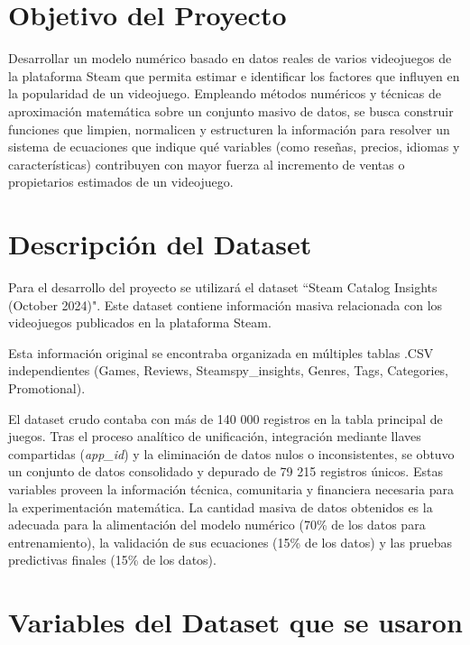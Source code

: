 \documentclass[12pt]{report}
\begin{document}
\section*{Objetivo del Proyecto}

Desarrollar un modelo numérico basado en datos reales de varios videojuegos de la plataforma Steam que permita estimar e identificar los factores que influyen en la popularidad de un videojuego. Empleando métodos numéricos y técnicas de aproximación matemática sobre un conjunto masivo de datos, se busca construir funciones que limpien, normalicen y estructuren la información para resolver un sistema de ecuaciones que indique qué variables (como reseñas, precios, idiomas y características) contribuyen con mayor fuerza al incremento de ventas o propietarios estimados de un videojuego.


\section*{Descripción del Dataset}

Para el desarrollo del proyecto se utilizará el dataset “Steam Catalog Insights (October 2024)"\cite{newbie_steam_insights}. Este dataset contiene información masiva relacionada con los videojuegos publicados en la plataforma Steam.

Esta información original se encontraba organizada en múltiples tablas .CSV independientes (Games, Reviews, Steamspy\_insights, Genres, Tags, Categories, Promotional). 

El dataset crudo contaba con más de 140 000 registros en la tabla principal de juegos. Tras el proceso analítico de unificación, integración mediante llaves compartidas (\textit{app\_id}) y la eliminación de datos nulos o inconsistentes, se obtuvo un conjunto de datos consolidado y depurado de 79 215 registros únicos. Estas variables proveen la información técnica, comunitaria y financiera necesaria para la experimentación matemática. La cantidad masiva de datos obtenidos es la adecuada para la alimentación del modelo numérico (70\% de los datos para entrenamiento), la validación de sus ecuaciones (15\% de los datos) y las pruebas predictivas finales (15\% de los datos).


\section*{Variables del Dataset que se usaron}
\end{document}
